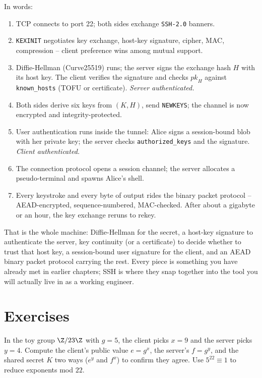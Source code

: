 In words:

\begin{enumerate}
  \item TCP connects to port 22; both sides exchange \texttt{SSH-2.0} banners.
  \item \texttt{KEXINIT} negotiates key exchange, host-key signature, cipher, MAC, compression -- client preference wins among mutual support.
  \item Diffie-Hellman (Curve25519) runs; the server signs the exchange hash $H$ with its host key. The client verifies the signature and checks $\textit{pk}_H$ against \texttt{known\_hosts} (TOFU or certificate). \emph{Server authenticated.}
  \item Both sides derive six keys from $(K,H)$, send \texttt{NEWKEYS}; the channel is now encrypted and integrity-protected.
  \item User authentication runs inside the tunnel: Alice signs a session-bound blob with her private key; the server checks \texttt{authorized\_keys} and the signature. \emph{Client authenticated.}
  \item The connection protocol opens a session channel; the server allocates a pseudo-terminal and spawns Alice's shell.
  \item Every keystroke and every byte of output rides the binary packet protocol -- AEAD-encrypted, sequence-numbered, MAC-checked. After about a gigabyte or an hour, the key exchange reruns to rekey.
\end{enumerate}

That is the whole machine: Diffie-Hellman for the secret, a host-key signature to authenticate the server, key continuity (or a certificate) to decide whether to trust that host key, a session-bound user signature for the client, and an AEAD binary packet protocol carrying the rest. Every piece is something you have already met in earlier chapters; SSH is where they snap together into the tool you will actually live in as a working engineer.

\section{Exercises}

\begin{exercise}
In the toy group $\Z/23\Z$ with $g = 5$, the client picks $x = 9$ and the server picks $y = 4$. Compute the client's public value $e = g^x$, the server's $f = g^y$, and the shared secret $K$ two ways ($e^y$ and $f^x$) to confirm they agree. Use $5^{22}\equiv 1$ to reduce exponents mod $22$.
\end{exercise}

